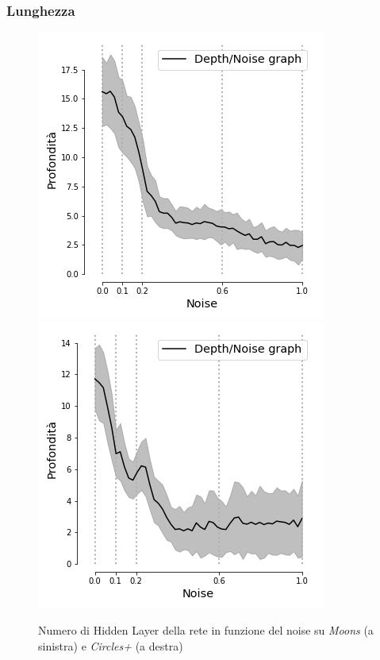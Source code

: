 \documentclass{beamer}
\begin{document}
\begin{frame}
 \frametitle{Lunghezza}
 \begin{figure}
 \includegraphics[scale = 0.42]{images/depth_noise_moons.png}
 \includegraphics[scale = 0.42]{images/depth_noise_circles+.png}
 \caption{\large Numero di Hidden Layer della rete in funzione del noise su \textit{Moons} (a sinistra) e \textit{Circles+} (a destra)} 
 \end{figure}
\end{frame}
\end{document}
